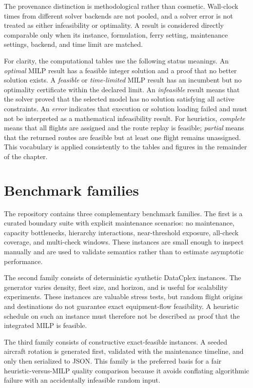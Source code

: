 The provenance distinction is methodological rather than cosmetic. Wall-clock
times from different solver backends are not pooled, and a solver error is not
treated as either infeasibility or optimality. A result is considered directly
comparable only when its instance, formulation, ferry setting, maintenance
settings, backend, and time limit are matched.

For clarity, the computational tables use the following status meanings. An
\emph{optimal} MILP result has a feasible integer solution and a proof that no
better solution exists. A \emph{feasible} or \emph{time-limited} MILP result
has an incumbent but no optimality certificate within the declared limit. An
\emph{infeasible} result means that the solver proved that the selected model
has no solution satisfying all active constraints. An \emph{error} indicates
that execution or solution loading failed and must not be interpreted as a
mathematical infeasibility result. For heuristics, \emph{complete} means that
all flights are assigned and the route replay is feasible; \emph{partial}
means that the returned routes are feasible but at least one flight remains
unassigned. This vocabulary is applied consistently to the tables and figures
in the remainder of the chapter.

\section{Benchmark families}
\label{sec:computational_instances}

The repository contains three complementary benchmark families. The first is a
curated boundary suite with explicit maintenance scenarios: no maintenance,
capacity bottlenecks, hierarchy interactions, near-threshold exposure, all-check
coverage, and multi-check windows. These instances are small enough to inspect
manually and are used to validate semantics rather than to estimate asymptotic
performance.

The second family consists of deterministic synthetic DataCplex instances. The
generator varies density, fleet size, and horizon, and is useful for scalability
experiments. These instances are valuable stress tests, but random flight
origins and destinations do not guarantee exact equipment-flow feasibility. A
heuristic schedule on such an instance must therefore not be described as proof
that the integrated MILP is feasible.

The third family consists of constructive exact-feasible instances. A seeded
aircraft rotation is generated first, validated with the maintenance timeline,
and only then serialized to JSON. This family is the preferred basis for a fair
heuristic-versus-MILP quality comparison because it avoids conflating algorithmic
failure with an accidentally infeasible random input.

